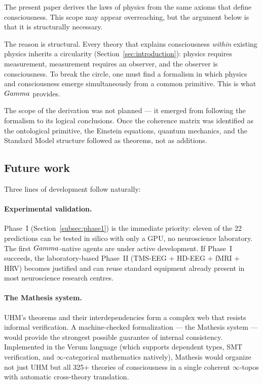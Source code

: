 The present paper derives the laws of physics from the same axioms that
define consciousness. This scope may appear overreaching, but the argument
below is that it is structurally necessary.

The reason is structural. Every theory that explains consciousness
\emph{within} existing physics inherits a circularity
(Section~\ref{sec:introduction}): physics requires measurement, measurement
requires an observer, and the observer is consciousness. To break the
circle, one must find a formalism in which physics and consciousness emerge
simultaneously from a common primitive. This is what $Gamma$ provides.

The scope of the derivation was not planned --- it emerged from following
the formalism to its logical conclusions. Once the coherence matrix was
identified as the ontological primitive, the Einstein equations, quantum
mechanics, and the Standard Model structure followed as theorems, not as
additions.

\subsection{Future work}

Three lines of development follow naturally:

\paragraph{Experimental validation.}
Phase~I (Section~\ref{subsec:phase1}) is the immediate priority: eleven of
the 22 predictions can be tested in silico with only a GPU, no
neuroscience laboratory. The first $Gamma$-native agents are under active
development. If Phase~I succeeds, the laboratory-based Phase~II
(TMS-EEG + HD-EEG + fMRI + HRV) becomes justified and can reuse standard
equipment already present in most neuroscience research centres.

\paragraph{The Mathesis system.}
UHM's theorems and their interdependencies form a complex web that resists informal
verification. A machine-checked formalization --- the Mathesis system --- would provide
the strongest possible guarantee of internal consistency. Implemented in the Verum
language (which supports dependent types, SMT verification, and $\infty$-categorical
mathematics natively), Mathesis would organize not just UHM but all 325+ theories of
consciousness in a single coherent $\infty$-topos with automatic cross-theory translation.

